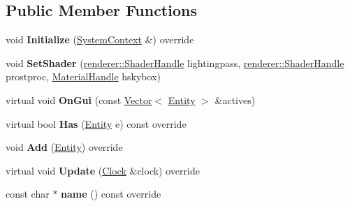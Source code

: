 \subsection*{Public Member Functions}
\begin{DoxyCompactItemize}
\item 
\mbox{\label{classnabla_1_1_lighting_system_ac141794bec8102b0d42c8071ba2efa0b}} 
void {\bfseries Initialize} (\mbox{\hyperlink{structnabla_1_1_system_context}{System\+Context}} \&) override
\item 
\mbox{\label{classnabla_1_1_lighting_system_a4d327d3b6d9413f8856b0ff4c19575ca}} 
void {\bfseries Set\+Shader} (\mbox{\hyperlink{classnabla_1_1renderer_1_1_handle}{renderer\+::\+Shader\+Handle}} lightingpass, \mbox{\hyperlink{classnabla_1_1renderer_1_1_handle}{renderer\+::\+Shader\+Handle}} prostproc, \mbox{\hyperlink{classnabla_1_1renderer_1_1_handle}{Material\+Handle}} hskybox)
\item 
\mbox{\label{classnabla_1_1_lighting_system_a339b11efa14cc40de01fbcf891deef61}} 
virtual void {\bfseries On\+Gui} (const \mbox{\hyperlink{classnabla_1_1_s_t_l_vector_ex}{Vector}}$<$ \mbox{\hyperlink{structnabla_1_1_entity}{Entity}} $>$ \&actives)
\item 
\mbox{\label{classnabla_1_1_lighting_system_acbb3e5acee87dec7b3fdb9fccde7f64b}} 
virtual bool {\bfseries Has} (\mbox{\hyperlink{structnabla_1_1_entity}{Entity}} e) const override
\item 
\mbox{\label{classnabla_1_1_lighting_system_a79c4950edaccfe93d88e12c673c15247}} 
void {\bfseries Add} (\mbox{\hyperlink{structnabla_1_1_entity}{Entity}}) override
\item 
\mbox{\label{classnabla_1_1_lighting_system_a6291217172666d0030379bf368f61aaa}} 
virtual void {\bfseries Update} (\mbox{\hyperlink{classnabla_1_1_clock}{Clock}} \&clock) override
\item 
\mbox{\label{classnabla_1_1_lighting_system_a1ff328d5ae1f56216521b527598327c4}} 
const char $\ast$ {\bfseries name} () const override

\end{DoxyCompactItemize}
